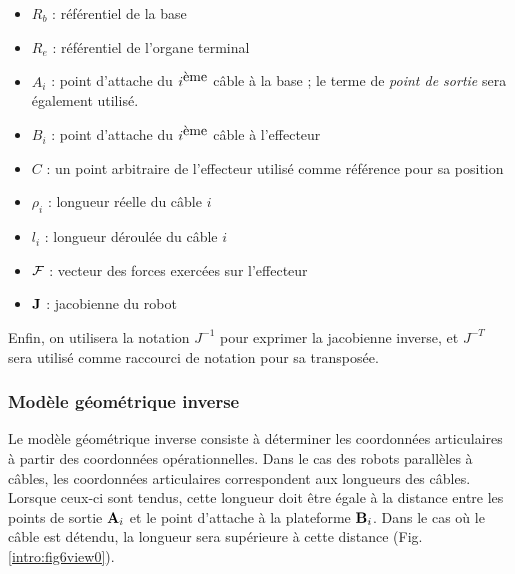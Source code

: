 \begin{itemize}
 \item $R_b$ : référentiel de la base
 \item $R_e$ : référentiel de l'organe terminal
 \item $A_i$ : point d'attache du $i^{\hbox{ème}}$ câble à la base ; le terme de {\it point de sortie} sera également utilisé.
 \item $B_i$ : point d'attache du $i^{\hbox{ème}}$ câble à l'effecteur
 \item $C$ : un point arbitraire de l'effecteur utilisé comme référence pour sa position
 \item $\rho_i$ : longueur réelle du câble $i$
 \item $l_i$ : longueur déroulée du câble $i$
 \item $\bf {\mathcal F}$ : vecteur des forces exercées sur l'effecteur
 \item $\bf J$ : jacobienne du robot
\end{itemize}
Enfin, on utilisera la notation $J^{-1}$ pour exprimer la jacobienne inverse, et $J^{-T}$ sera utilisé comme raccourci de notation pour sa transposée.

\subsubsection{Modèle géométrique inverse}

Le modèle géométrique inverse consiste à déterminer les coordonnées articulaires à partir des coordonnées opérationnelles. Dans le cas des robots parallèles à câbles, les coordonnées articulaires correspondent aux longueurs des câbles. Lorsque ceux-ci sont tendus, cette longueur doit être égale à la distance entre les points de sortie ${\bf A}_i$ et le point d'attache à la plateforme ${\bf B}_i$. Dans le cas où le câble est détendu, la longueur sera supérieure à cette distance (Fig.\ref{intro:fig6view0}).\\

